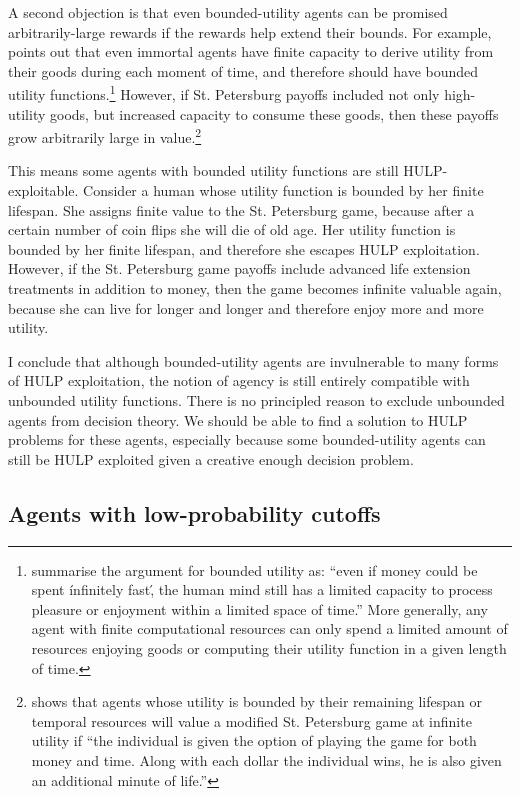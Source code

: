 \documentclass{article}
\begin{document}
A second objection is that even bounded-utility agents can be promised arbitrarily-large rewards if the rewards help extend their bounds. For example, \citet{brito1975becker} points out that even immortal agents have finite capacity to derive utility from their goods during each moment of time, and therefore should have bounded utility functions.\footnote{\citet{cowen1988time} summarise the argument for bounded utility as: ``even if money could be spent \'infinitely fast\', the human mind still has a limited capacity to process pleasure or enjoyment within a limited space of time.'' More generally, any agent with finite computational resources can only spend a limited amount of resources enjoying goods or computing their utility function in a given length of time.} However, if St. Petersburg payoffs included not only high-utility goods, but increased capacity to consume these goods, then these payoffs grow arbitrarily large in value.\footnote{\citet{cowen1988time} shows that agents whose utility is bounded by their remaining lifespan or temporal resources will value a modified St. Petersburg game at infinite utility if ``the individual is given the option of playing the game for both money and time. Along with each dollar the individual wins, he is also given an additional minute of life.''}

This means some agents with bounded utility functions are still HULP-exploitable. Consider a human whose utility function is bounded by her finite lifespan. She assigns finite value to the St. Petersburg game, because after a certain number of coin flips she will die of old age. Her utility function is bounded by her finite lifespan, and therefore she escapes HULP exploitation. However, if the St. Petersburg game payoffs include advanced life extension treatments in addition to money, then the game becomes infinite valuable again, because she can live for longer and longer and therefore enjoy more and more utility.

I conclude that although bounded-utility agents are invulnerable to many forms of HULP exploitation, the notion of agency is still entirely compatible with unbounded utility functions. There is no principled reason to exclude unbounded agents from decision theory. We should be able to find a solution to HULP problems for these agents, especially because some bounded-utility agents can still be HULP exploited given a creative enough decision problem.

\subsection{Agents with low-probability cutoffs}
\end{document}
